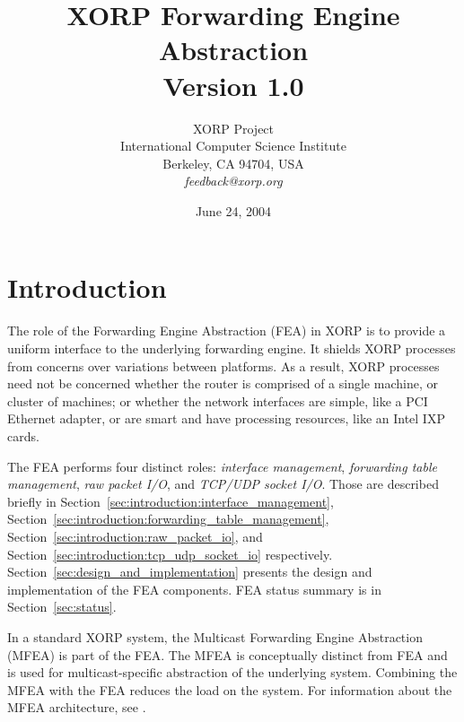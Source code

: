 \documentclass[11pt]{article}
\begin{document}
\title{XORP Forwarding Engine Abstraction \\
\vspace{1ex}
Version 1.0}
\author{ XORP Project					\\
	 International Computer Science Institute	\\
	 Berkeley, CA 94704, USA			\\
	 {\it feedback@xorp.org}
}
\date{June 24, 2004}

\maketitle

\thispagestyle{empty}


\section{Introduction}
\label{sec:introduction}

The role of the Forwarding Engine Abstraction (FEA) in XORP is to
provide a uniform interface to the underlying forwarding engine.  It
shields XORP processes from concerns over variations between
platforms.  As a result, XORP processes need not be concerned whether
the router is comprised of a single machine, or cluster of machines;
or whether the network interfaces are simple, like a PCI Ethernet
adapter, or are smart and have processing resources, like an Intel IXP
cards.

The FEA performs four distinct roles: \emph{interface management},
\emph{forwarding table management}, \emph{raw packet I/O},
and \emph{TCP/UDP socket I/O}.  Those are
described briefly in
Section~\ref{sec:introduction:interface_management},
Section~\ref{sec:introduction:forwarding_table_management},
Section~\ref{sec:introduction:raw_packet_io},
and Section~\ref{sec:introduction:tcp_udp_socket_io}
respectively.
Section~\ref{sec:design_and_implementation} presents
the design and implementation of the FEA components.
FEA status summary is in Section~\ref{sec:status}.

In a standard XORP system, the Multicast Forwarding Engine Abstraction
(MFEA) is part of the FEA.  The MFEA is conceptually distinct from
FEA and is used for multicast-specific abstraction of the underlying system.
Combining the MFEA with the FEA reduces the load on the system.  For
information about the MFEA architecture, see \cite{xorp:mfea}.

\end{document}
